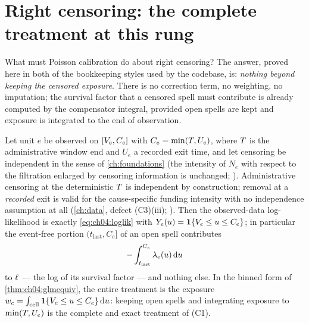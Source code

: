 \section{Right censoring: the complete treatment at this rung}\label{ch04:sec:censoring}

What must Poisson calibration do about right censoring? The answer,
proved here in
both of the bookkeeping styles used by the codebase, is: \emph{nothing
beyond keeping the censored exposure}. There is no correction term, no
weighting, no imputation; the survival factor that a censored spell must
contribute is already computed by the compensator integral, provided open
spells are kept and exposure is integrated to the end of observation.

\begin{proposition}\label{prop:ch04:censorexact}
Let unit $e$ be observed on $[V_e, C_e]$ with $C_e = \min(T,
U_e)$, where $T$ is the administrative window end and $U_e$ a recorded
exit time, and let censoring be independent in the sense of
\cref{ch:foundations} (the intensity of $N_e$ with respect to the
filtration enlarged by censoring information is unchanged;
\citealp[III.2]{abgk1993}). Administrative censoring at the deterministic
$T$ is independent by construction; removal at a \emph{recorded} exit
is valid for the cause-specific funding intensity with no independence
assumption at all (\cref{ch:data}, defect (C3)(iii);
\citealp{putter2007}). Then the observed-data log-likelihood is exactly
\cref{eq:ch04:loglik} with $Y_e(u) = \mathbf{1}\{V_e \le u \le C_e\}$;
in particular the event-free portion $(t_{\mathrm{last}}, C_e]$ of an open
spell contributes
\[
-\int_{t_{\mathrm{last}}}^{C_e} \lambda_e(u) \,\mathrm{d} u
\]
to $\ell$ --- the log of its survival factor --- and nothing else. In
the binned form of \cref{thm:ch04:glmequiv}, the entire treatment is the
exposure $w_c = \int_{\text{cell}} \mathbf{1}\{V_e \le u \le C_e\} \,\mathrm{d} u$:
keeping open spells and integrating exposure to $\min(T, U_e)$ is the
complete and exact treatment of (C1).
\end{proposition}

